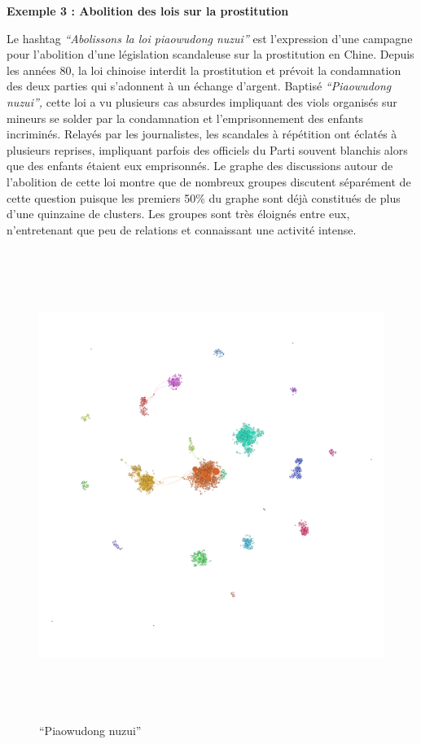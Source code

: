 \clearpage
\textbf{Exemple 3 : Abolition des lois sur la prostitution}

Le hashtag \textit{{\textquotedblleft}Abolissons la loi piaowudong
nuzui{\textquotedblright} }est l{\textquoteright}expression
d{\textquoteright}une campagne pour l{\textquoteright}abolition
d{\textquoteright}une l\'egislation scandaleuse sur la prostitution en
Chine. Depuis les ann\'ees 80, la loi chinoise interdit la prostitution
et pr\'evoit la condamnation des deux parties qui
s{\textquoteright}adonnent \`a un \'echange d{\textquoteright}argent.
Baptis\'e \textit{{\textquotedblleft}Piaowudong
nuzui{\textquotedblright}, }cette loi a vu plusieurs cas absurdes
impliquant des viols organis\'es sur mineurs se solder par la
condamnation et l{\textquoteright}emprisonnement des enfants
incrimin\'es. Relay\'es par les journalistes, les scandales \`a
r\'ep\'etition ont \'eclat\'es \`a plusieurs reprises, impliquant
parfois des officiels du Parti souvent blanchis alors que des enfants
\'etaient eux emprisonn\'es. Le graphe des discussions autour de
l{\textquoteright}abolition de cette loi montre que de nombreux groupes
discutent s\'epar\'ement de cette question puisque les premiers 50\% du
graphe sont d\'ej\`a constitu\'es de plus d{\textquoteright}une
quinzaine de clusters. Les groupes sont tr\`es \'eloign\'es entre eux,
n{\textquoteright}entretenant que peu de relations et connaissant une
activit\'e intense.

\begin{figure}
    \centering
    \includegraphics[width=6.0114in,height=6.0114in]{figures/chap3/chapitre3-img19.png}
    \caption{ {\textquotedblleft}Piaowudong nuzui{\textquotedblright}}
\end{figure}

